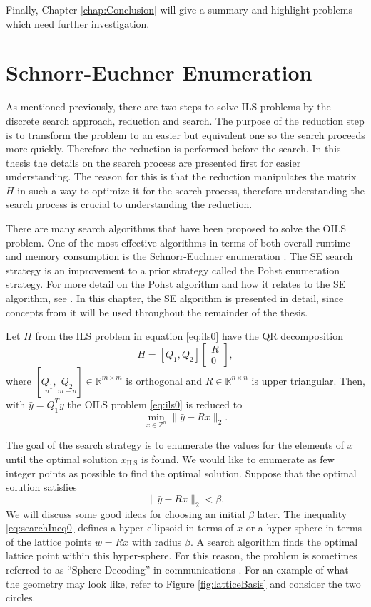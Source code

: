 \documentclass[12pt,Bold,letterpaper]{mcgilletdclass}
\newcommand{\bmx}{\begin{bmatrix}}
\newcommand{\emx}{\end{bmatrix}}
\newcommand{\be}{\begin{equation}}
\newcommand{\ee}{\end{equation}}
\newcommand{\by}{{\bar{y}}}
\begin{document}
Finally, Chapter \ref{chap:Conclusion} will give a summary and highlight problems which need further investigation.

\chapter{Schnorr-Euchner Enumeration} \label{chap:SESearch}

As mentioned previously, there are two steps to solve ILS problems by the discrete search approach, reduction and search. The purpose of the reduction step is to transform the problem to an easier but equivalent one so the search proceeds more quickly. Therefore the reduction is performed before the search. In this thesis the details on the search process are presented first for easier understanding. The reason for this is that the reduction manipulates the matrix $H$ in such a way to optimize it for the search process, therefore understanding the search process is crucial to understanding the reduction.

There are many search algorithms that have been proposed to solve the OILS problem. One of the most effective algorithms in terms of both overall runtime and memory consumption is the Schnorr-Euchner enumeration \cite{SchE94}. The SE search strategy is an improvement to a prior strategy called the Pohst enumeration strategy. For more detail on the Pohst algorithm and how it relates to the SE algorithm, see \cite{AgrEVZ02}. In this chapter, the SE algorithm is presented in detail, since concepts from it will be used throughout the remainder of the thesis.

Let $H$ from the ILS problem in equation \eqref{eq:ils0} have the QR decomposition
$$
H=[Q_1, Q_2] \bmx R \\ 0 \emx,
$$
where $[\underset{n}{Q_1}, \underset{m-n}{Q_2}]  \in \mathbb{R}^{m\times m}$ is orthogonal
and $R\in \mathbb{R}^{n\times n}$ is upper triangular. 
Then, with $\bar{y}=Q_1^Ty$ the OILS problem \eqref{eq:ils0} is reduced to 
\be 
\label{eq:ils}
\min_{x \in  {\mathbb{Z}^n}}  \| \by- Rx \|_2.
\ee

The goal of the search strategy is to enumerate the values for the elements of $x$ until the optimal solution $x_{\scriptscriptstyle{\mathrm{ILS}}}$ is found. We would like to enumerate as few integer points as possible to find the optimal solution. Suppose that the optimal solution satisfies
\be 
\label{eq:searchIneq0}
 \| \by- Rx \|_2 < \beta. 
\ee
We will discuss some good ideas for choosing an initial $\beta$ later. The inequality \eqref{eq:searchIneq0} defines a hyper-ellipsoid in terms of $x$ or a hyper-sphere in terms of the lattice points $w=Rx$ with radius $\beta$. A search algorithm finds the optimal lattice point within this hyper-sphere. For this reason, the problem is sometimes referred to as ``Sphere Decoding'' in communications \cite{HasV05}. For an example of what the geometry may look like, refer to Figure \ref{fig:latticeBasis} and consider the two circles.
\end{document}
